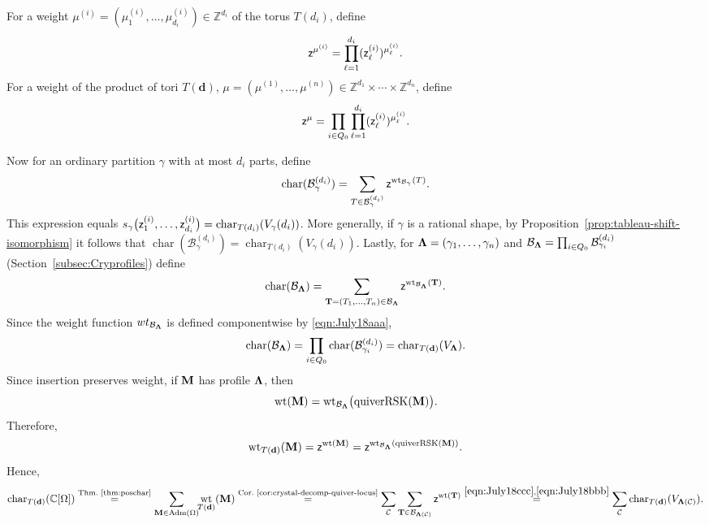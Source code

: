 \documentclass[12pt]{amsart}
\renewcommand{\d}{\mathbf{d}}
\DeclareMathOperator{\wt}{wt}
\DeclareMathOperator{\Std}{\operatorname{Adm}}
\theoremstyle{definition}
\theoremstyle{remark}
\begin{document}
For a weight $\mu^{(i)}=(\mu_1^{(i)},\ldots,\mu_{d_i}^{(i)})\in {\mathbb Z}^{d_i}$ of the torus $T(d_i)$, define 
\[{\sf z}^{\mu^{(i)}}=\prod_{\ell=1}^{d_i} ({\sf z}_{\ell}^{(i)})^{\mu_{\ell}^{(i)}}.\]
For a weight of the product of tori $T(\d)$, $\mu=(\mu^{(1)},\ldots,\mu^{(n)})\in {\mathbb Z}^{d_1}\times\cdots
\times {\mathbb Z}^{d_n}$, define
\[{\sf z}^{\mu}=\prod_{i\in Q_0}\prod_{\ell=1}^{d_i} ({\sf z}_{\ell}^{(i)})^{{\mu}_{\ell}^{(i)}}.\]

Now for an ordinary partition $\gamma$ with at most $d_i$ parts, define
\[\operatorname{char}({\mathcal B}_{\gamma}^{(d_i)})
=\sum_{T\in {\mathcal B}_{\gamma}^{(d_i)}} {\sf z}^{\operatorname{wt}_{{\mathcal B_{\gamma}}}(T)}.\]
This expression equals 
$s_\gamma\bigl({\sf z}^{(i)}_1,\ldots,{\sf z}^{(i)}_{d_i}\bigr) =\operatorname{char}_{T(d_i)}(V_\gamma(d_i))$.
More generally, if $\gamma$ is a rational shape, by Proposition~\ref{prop:tableau-shift-isomorphism} it follows that
$\operatorname{char}({\mathcal B}_{\gamma}^{(d_i)})=\operatorname{char}_{T(d_i)}(V_\gamma(d_i))$.
Lastly, for ${\bf{\Lambda}}=(\gamma_1,\ldots,\gamma_n)$ and ${\mathcal B}_{{\bf \Lambda}}=\prod_{i\in Q_0}
{\mathcal B}_{\gamma_i}^{(d_i)}$ (Section~\ref{subsec:Cryprofiles}) define
\begin{equation}
\label{eqn:July18ccc}
\operatorname{char}({\mathcal B}_{\bf \Lambda})=\sum_{{\bf T}=(T_1,\ldots,T_n)\in {\mathcal B}_{\bf \Lambda}}
{\sf z}^{\operatorname{wt}_{{\mathcal B}_{\bf\Lambda}}({\bf T})}.
\end{equation}
Since the weight function ${wt}_{{\mathcal B}_{\bf\Lambda}}$ is defined componentwise by \eqref{eqn:July18aaa},
\begin{equation}
\label{eqn:July18bbb}
\operatorname{char}({\mathcal B}_{\bf{\Lambda}})=\prod_{i\in Q_0} \operatorname{char}({\mathcal B}_{\gamma_i}^{(d_i)})
=\operatorname{char}_{T(\d)}(V_{\bf\Lambda}).
\end{equation}
Since insertion preserves weight, if ${\bf M}$ has profile
${\bf\Lambda}$, then
\[
\operatorname{wt}({\bf M})
=
\operatorname{wt}_{{\mathcal B}_{\bf\Lambda}}
\bigl(\operatorname{quiverRSK}({\bf M})\bigr).
\]
Therefore,
\[\operatorname{wt}_{T({\bf d})}({\bf M})
= {\sf z}^{\operatorname{wt}({\bf M})}
= {\sf z}^{\operatorname{wt}_{{\mathcal B}_{\bf\Lambda}}
(\operatorname{quiverRSK}({\bf M}))}.\]
Hence,
\[\operatorname{char}_{T(\d)}(\mathbb{C}[\Omega])\stackrel{\text{Thm.~\ref{thm:poschar}}}{=}
\sum_{{\bf M}\in \Std(\Omega)} \!\!\wt_{T(\d)}({\bf M}) 
\stackrel{\text{Cor.~\ref{cor:crystal-decomp-quiver-locus}}}{=}
\sum_{\mathcal{C}}\sum_{{\bf T}\in \mathcal{B}_{{\bf \Lambda}(\mathcal{C})} } {\sf z}^{\wt({\bf T})} 
\stackrel{\eqref{eqn:July18ccc}, \eqref{eqn:July18bbb}}{=} \sum_{\mathcal{C}} \text{char}_{T(\d)}(V_{{\bf \Lambda}(\mathcal{C})}).\]
\end{document}
